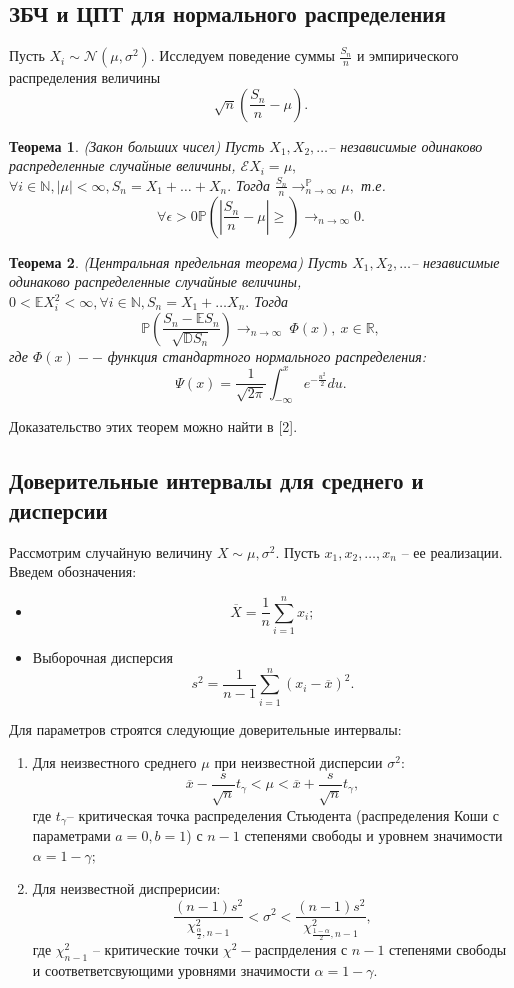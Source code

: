 \documentclass[11pt]{article}
\newtheorem{theorem}{Теорема}
\numberwithin{equation}{section}
\begin{document}
\subsection{ЗБЧ и ЦПТ для нормального распределения}
Пусть $X_i \sim \mathcal{N}(\mu,\sigma^2).$ Исследуем поведение суммы $\frac{S_n}{n}$ и эмпирического распределения
величины 
$$ \sqrt{n}(\frac{S_n}{n}-\mu).$$
\begin{theorem}(Закон больших чисел)
  Пусть $X_1, X_2, \dots $-- независимые одинаково распределенные случайные величины, $\mathcal{E}X_i=\mu,$\ 
  $\forall i \in \mathbb{N}, |\mu| < \infty, S_n=X_1+\dots+X_n.$ Тогда $\frac{S_n}{n} \to_{n \to \infty}^{\mathbb{P}} \mu,$ т.е.
  $$ \forall \epsilon>0 \mathbb{P}(|\frac{S_n}{n}-\mu|\geq) \to_{n \to \infty} 0.$$
\end{theorem}


\begin{theorem}(Центральная предельная теорема)
  Пусть $X_1,X_2, \dots$-- независимые одинаково распределенные случайные величины, $0<\mathbb{E}X_i^2< \infty, \forall i \in \mathbb{N}, S_n=X_1+\dots X_n.$ Тогда
  $$ \mathbb{P} (\frac{S_n-\mathbb{E}S_n}{\sqrt{\mathbb{D}S_n}}) \to_{n \to \infty} \ \Phi(x), \ x \in \mathbb{R},$$
  где $\Phi(x)--$ функция стандартного нормального распределения:
  $$ \Psi(x) = \frac{1}{\sqrt{2\pi}} \int_{-\infty}^{x} e^{-\frac{u^2}{2}}du.$$
\end{theorem}
Доказательство этих теорем можно найти в [2].
\subsection{Доверительные интервалы для среднего и дисперсии}
Рассмотрим случайную величину $X \sim \mathcal{\mu, \sigma^2}.$ Пусть $x_1, x_2, \dots, x_n$ --
ее реализации.
Введем обозначения:
\begin{itemize}
  \item $$ \overline{X} = \frac{1}{n} \sum_{i=1}^{n} x_i;$$
  \item Выборочная дисперсия $$ s^2 = \frac{1}{n-1} \sum_{i=1}^{n}(x_i-\overline{x})^2.$$
\end{itemize}
Для параметров строятся следующие доверительные интервалы:
\begin{enumerate}
  \item Для неизвестного среднего $\mu$ при неизвестной дисперсии $\sigma^2:$
  $$ \overline{x}- \frac{s}{\sqrt{n}}t_{\gamma} < \mu < \overline{x} + \frac{s}{\sqrt{n}}t_{\gamma},$$
  где $t_{\gamma}$-- критическая точка распределения Стьюдента (распределения Коши с параметрами $a=0, b=1$) с $n-1$ 
  степенями свободы  и уровнем значимости $\alpha = 1 -\gamma;$
  \item Для неизвестной диспрерисии:
  $$ \frac{(n-1)s^2}{\chi_{\frac{\alpha}{2}, n-1}^{2}} < \sigma^2 < \frac{(n-1)s^2}{\chi_{\frac{1-\alpha}{2}, n-1}^{2}},$$  
  где $\chi_{n-1}^2$ -- критические точки $\chi^2-$распрделения с $n-1$ степенями свободы и соответветсвующими уровнями значимости $\alpha = 1 -\gamma.$
\end{enumerate}
\end{document}
